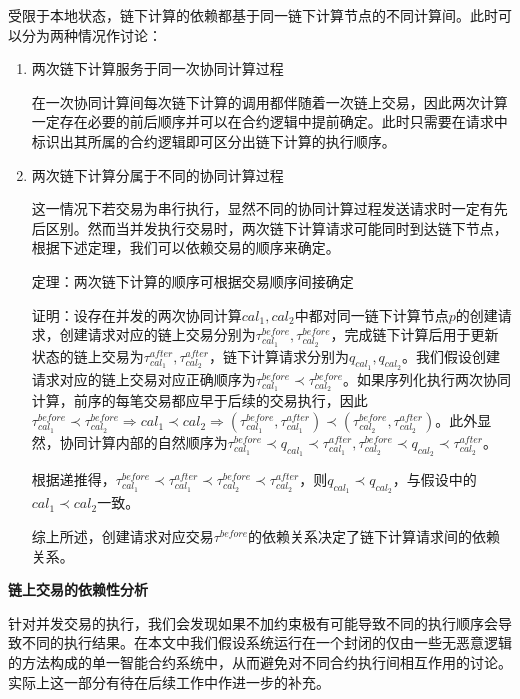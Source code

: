 受限于本地状态，链下计算的依赖都基于同一链下计算节点的不同计算间。此时可以分为两种情况作讨论：
\begin{enumerate}
    \item 两次链下计算服务于同一次协同计算过程
    
    在一次协同计算间每次链下计算的调用都伴随着一次链上交易，因此两次计算一定存在必要的前后顺序并可以在合约逻辑中提前确定。此时只需要在请求中标识出其所属的合约逻辑即可区分出链下计算的执行顺序。
    \item 两次链下计算分属于不同的协同计算过程
    
    这一情况下若交易为串行执行，显然不同的协同计算过程发送请求时一定有先后区别。然而当并发执行交易时，两次链下计算请求可能同时到达链下节点，根据下述定理，我们可以依赖交易的顺序来确定。

    定理：两次链下计算的顺序可根据交易顺序间接确定

    证明：设存在并发的两次协同计算${cal}_1, {cal}_2$中都对同一链下计算节点$p$的创建请求，创建请求对应的链上交易分别为$\tau_{{cal}_1}^{before}, \tau_{{cal}_2}^{before}$，完成链下计算后用于更新状态的链上交易为$\tau_{{cal}_1}^{after}, \tau_{{cal}_2}^{after}$，链下计算请求分别为$q_{{cal}_1}, q_{{cal}_2}$。我们假设创建请求对应的链上交易对应正确顺序为$\tau_{{cal}_1}^{before} \prec \tau_{{cal}_2}^{before}$。如果序列化执行两次协同计算，前序的每笔交易都应早于后续的交易执行，因此$\tau_{{cal}_1}^{before} \prec \tau_{{cal}_2}^{before} \Rightarrow {cal}_1\prec{cal}_2 \Rightarrow (\tau_{{cal}_1}^{before}, \tau_{{cal}_1}^{after})\prec (\tau_{{cal}_2}^{before},\tau_{{cal}_2}^{after}) $。此外显然，协同计算内部的自然顺序为$\tau_{{cal}_1}^{before}\prec q_{{cal}_1} \prec \tau_{{cal}_1}^{after}, \tau_{{cal}_2}^{before}\prec q_{{cal}_2} \prec \tau_{{cal}_2}^{after}$。
    
    根据递推得，$\tau_{{cal}_1}^{before} \prec \tau_{{cal}_1}^{after} \prec \tau_{{cal}_2}^{before} \prec \tau_{{cal}_2}^{after}$，则$q_{{cal}_1} \prec q_{{cal}_2}$，与假设中的${cal}_1\prec{cal}_2$一致。
    
    综上所述，创建请求对应交易$\tau^{before}$的依赖关系决定了链下计算请求间的依赖关系。
\end{enumerate}

\noindent\textbf{链上交易的依赖性分析}

针对并发交易的执行，我们会发现如果不加约束极有可能导致不同的执行顺序会导致不同的执行结果。在本文中我们假设系统运行在一个封闭的仅由一些无恶意逻辑的方法构成的单一智能合约系统中，从而避免对不同合约执行间相互作用的讨论。实际上这一部分有待在后续工作中作进一步的补充。

